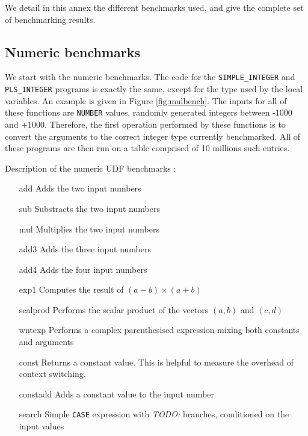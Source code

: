 \documentclass[twoside,11pt,a4paper]{article}
\newcommand{\todo}[1]{\textit{TODO: #1}}
\newcommand{\pls}[1]{\small\texttt{#1}\normalsize}
\newcommand{\plstype}[1]{\pls{#1}}
\newcommand{\oranum}{\plstype{NUMBER}}
\newcommand{\plsi}{\plstype{PLS\_INTEGER}}
\newcommand{\simpleint}{\plstype{SIMPLE\_INTEGER}}
\newcommand{\bench}[1]{\textsf{#1}}
\begin{document}
We detail in this annex the different benchmarks used, and give the complete set of benchmarking results.

\subsection*{Numeric benchmarks}

We start with the numeric benchmarks. The code for the \simpleint{} and \plsi{} programs is exactly the same, except for the type used by the local variables. An example is given in Figure \ref{fig:mulbench}. The inputs for all of these functions are \oranum{} values, randomly generated integers between -1000 and +1000. Therefore, the first operation performed by these functions is to convert the arguments to the correct integer type currently benchmarked. All of these programs are then run on a table comprised of 10 millions such entries.

\vspace{5mm}
Description of the numeric UDF benchmarks :
\begin{itemize}
\item[\bench{add}] Adds the two input numbers
\item[\bench{sub}] Substracts the two input numbers
\item[\bench{mul}] Multiplies the two input numbers
\item[\bench{add3}] Adds the three input numbers
\item[\bench{add4}] Adds the four input numbers
\item[\bench{exp1}] Computes the result of $(a -b)\times(a + b)$
\item[\bench{scalprod}] Performs the scalar product of the vectors $(a, b)$ and $(c, d)$
\item[\bench{wntexp}] Performs a complex parenthesised expression mixing both constants and arguments
\item[\bench{const}] Returns a constant value. This is helpful to measure the overhead of context switching.
\item[\bench{constadd}] Adds a constant value to the input number
\item[\bench{search}] Simple \pls{CASE} expression with \todo{} branches, conditioned on the input values
\end{itemize}
\end{document}
